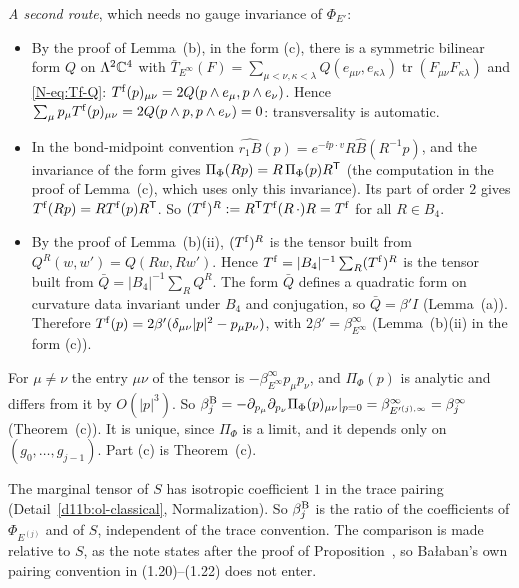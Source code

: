 \begin{step}
\emph{A second route}, which needs no gauge invariance of $\Phi_{E'}$:
\begin{itemize}
\item By the proof of Lemma~(b), in the form (c), there is a symmetric bilinear form $Q$ on $\Lambda^2\mathbb C^4$ with $\bar T_{E^\infty}(F)=\sum_{\mu<\nu,\kappa<\lambda}Q(e_{\mu\nu},e_{\kappa\lambda})\operatorname{tr}(F_{\mu\nu}F_{\kappa\lambda})$ and \eqref{N-eq:Tf-Q}: $T^{\rm f}(p)_{\mu\nu}=2Q(p\wedge e_\mu,p\wedge e_\nu)$. Hence $\sum_\mu p_\mu T^{\rm f}(p)_{\mu\nu}=2Q(p\wedge p,p\wedge e_\nu)=0$: transversality is automatic.
\item In the bond-midpoint convention $\widehat{r_1B}(p)=e^{-\ii p\cdot v}R\hat B(R^{-1}p)$, and the invariance of the form gives $\Pi_\Phi(Rp)=R\,\Pi_\Phi(p)R^{\sf T}$ (the computation in the proof of Lemma~(c), which uses only this invariance). Its part of order $2$ gives $T^{\rm f}(Rp)=RT^{\rm f}(p)R^{\sf T}$. So $(T^{\rm f})^R:=R^{\sf T}T^{\rm f}(R\,\cdot)R=T^{\rm f}$ for all $R\in B_4$.
\item By the proof of Lemma~(b)(ii), $(T^{\rm f})^R$ is the tensor built from $Q^R(w,w')=Q(Rw,Rw')$. Hence $T^{\rm f}=|B_4|^{-1}\sum_R(T^{\rm f})^R$ is the tensor built from $\bar Q=|B_4|^{-1}\sum_RQ^R$. The form $\bar Q$ defines a quadratic form on curvature data invariant under $B_4$ and conjugation, so $\bar Q=\beta'I$ (Lemma~(a)). Therefore $T^{\rm f}(p)=2\beta'(\delta_{\mu\nu}|p|^2-p_\mu p_\nu)$, with $2\beta'=\beta^\infty_{E^\infty}$ (Lemma~(b)(ii) in the form (c)).
\end{itemize}
\end{step}

\begin{step}
For $\mu\ne\nu$ the entry $\mu\nu$ of the tensor is $-\beta^\infty_{E^\infty}p_\mu p_\nu$, and $\Pi_\Phi(p)$ is analytic and differs from it by $O(|p|^3)$. So $\beta^{\rm B}_j=-\partial_{p_\mu}\partial_{p_\nu}\Pi_\Phi(p)_{\mu\nu}|_{p=0}=\beta^\infty_{E'^{(j),\infty}}=\beta^\infty_j$ (Theorem~(c)). It is unique, since $\Pi_\Phi$ is a limit, and it depends only on $(g_0,\dots,g_{j-1})$. Part (c) is Theorem~(c).

The marginal tensor of $S$ has isotropic coefficient $1$ in the trace pairing (Detail~\ref{d11b:ol-classical}, Normalization). So $\beta^{\rm B}_j$ is the ratio of the coefficients of $\Phi_{E^{(j)}}$ and of $S$, independent of the trace convention. The comparison is made relative to $S$, as the note states after the proof of Proposition~, so Ba\l aban's own pairing convention in (1.20)--(1.22) does not enter.
\end{step}

